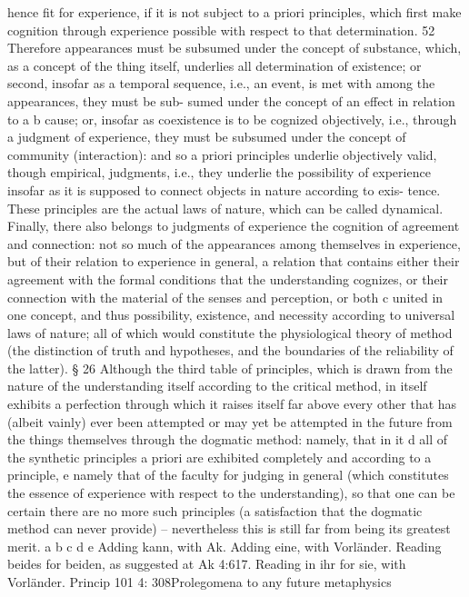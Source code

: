 hence ﬁt for experience, if it is not subject to a priori principles, which
ﬁrst make cognition through experience possible with respect to that
determination. 52 Therefore appearances must be subsumed under the
concept of substance, which, as a concept of the thing itself, underlies all
determination of existence; or second, insofar as a temporal sequence,
i.e., an event, is met with among the appearances, they must be sub-
sumed under the concept of an effect in relation to a b cause; or, insofar
as coexistence is to be cognized objectively, i.e., through a judgment of
experience, they must be subsumed under the concept of community
(interaction): and so a priori principles underlie objectively valid, though
empirical, judgments, i.e., they underlie the possibility of experience
insofar as it is supposed to connect objects in nature according to exis-
tence. These principles are the actual laws of nature, which can be called
dynamical.
Finally, there also belongs to judgments of experience the cognition
of agreement and connection: not so much of the appearances among
themselves in experience, but of their relation to experience in general, a
relation that contains either their agreement with the formal conditions
that the understanding cognizes, or their connection with the material
of the senses and perception, or both c united in one concept, and thus
possibility, existence, and necessity according to universal laws of nature;
all of which would constitute the physiological theory of method (the
distinction of truth and hypotheses, and the boundaries of the reliability
of the latter).
§ 26
Although the third table of principles, which is drawn from the nature of
the understanding itself according to the critical method, in itself exhibits
a perfection through which it raises itself far above every other that
has (albeit vainly) ever been attempted or may yet be attempted in the
future from the things themselves through the dogmatic method: namely,
that in it d all of the synthetic principles a priori are exhibited completely
and according to a principle, e namely that of the faculty for judging
in general (which constitutes the essence of experience with respect to
the understanding), so that one can be certain there are no more such
principles (a satisfaction that the dogmatic method can never provide) –
nevertheless this is still far from being its greatest merit.
a
b
c
d
e
Adding kann, with Ak.
Adding eine, with Vorländer.
Reading beides for beiden, as suggested at Ak 4:617.
Reading in ihr for sie, with Vorländer.
Princip
101
4: 308Prolegomena to any future metaphysics
